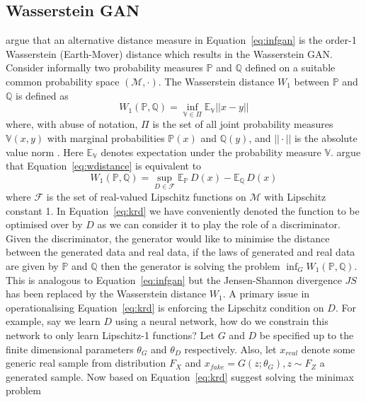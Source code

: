 \documentclass[12pt]{article}
\newcommand{\re}[1]{\textcolor{blue}{[#1]}}
\begin{document}
\subsection{Wasserstein GAN}
\citet{arjovsky2017wasserstein} argue that an alternative distance measure in Equation~\ref{eq:infgan} is the order-1 Wasserstein (Earth-Mover) distance which results in the Wasserstein GAN. Consider informally two probability measures $\mathbb{P}$ and $\mathbb{Q}$ defined on a suitable common probability space $(\mathcal{M}, \cdot)$. The Wasserstein distance $W_1$ between $\mathbb{P}$ and $\mathbb{Q}$ is defined as
\begin{equation}
W_1(\mathbb{P}, \mathbb{Q}) = \inf_{\mathbb{V} \in \Pi} \mathbb{E}_{\mathbb{V}}{||x - y||} \label{eq:wdistance}
\end{equation}
%
where, with abuse of notation, $\Pi$ is the set of all joint probability measures $\mathbb{V}(x, y)$ with marginal probabilities $\mathbb{P}(x)$ and $\mathbb{Q}(y)$, and $|| \cdot ||$ is the absolute value norm \citep{arjovsky2017wasserstein}. Here $\mathbb{E}_{\mathbb{V}}$ denotes expectation under the probability measure $\mathbb{V}$. %
\citet{arjovsky2017wasserstein} argue that Equation~\ref{eq:wdistance} is equivalent to %
\begin{equation}
W_1(\mathbb{P}, \mathbb{Q}) = \sup_{D \in \mathcal{F}} \mathbb{E}_{\mathbb{P}} \, D(x) - \mathbb{E}_{\mathbb{Q}} \, D(x)
\label{eq:krd}
\end{equation}
where $\mathcal{F}$ is the set of real-valued Lipschitz functions on $\mathcal{M}$ with Lipschitz constant 1. %
In Equation~\ref{eq:krd} we have conveniently denoted the function to be optimised over by $D$ as we can consider it to play the role of a discriminator. Given the discriminator, the generator would like to minimise the distance between the generated data and real data, if the laws of generated and real data are given by $\mathbb{P}$ and $\mathbb{Q}$ then the generator is solving the problem $\inf_{G} W_1(\mathbb{P}, \mathbb{Q})$. This is analogous to Equation~\ref{eq:infgan} but the Jensen-Shannon divergence $JS$ has been replaced by the Wasserstein distance $W_1$.
A primary issue in operationalising Equation~\ref{eq:krd} is enforcing the Lipschitz condition on $D$. For example, say we learn $D$ using a neural network, how do we constrain this network to only learn Lipschitz-1 functions? Let $G$ and $D$ be specified up to the finite dimensional parameters $\theta_G$ and $\theta_D$ respectively. Also, let $x_{real}$ denote some generic real sample from distribution $F_X$ and $x_{fake} = G(z; \theta_G), z \sim F_Z$ a generated sample. Now based on Equation~\ref{eq:krd} \citet{arjovsky2017wasserstein} suggest solving the minimax problem
\end{document}
